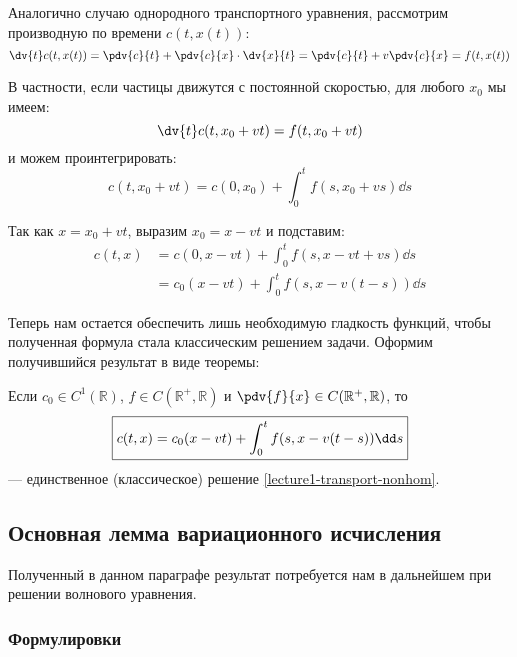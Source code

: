 Аналогично случаю однородного транспортного уравнения, рассмотрим производную по времени $c(t, x(t))$:
%
\begin{equation*}
  \dv{t} c(t, x(t)) = \pdv{c}{t} + \pdv{c}{x} \cdot \dv{x}{t} = \pdv{c}{t} + v \pdv{c}{x} = f(t, x(t))
\end{equation*}

В частности, если частицы движутся с постоянной скоростью, для любого $x_0$ мы имеем:
\begin{equation*}
  \dv{t} c(t, x_0 + vt) = f(t, x_0 + vt)
\end{equation*}
%
и можем проинтегрировать:
%
\begin{equation*}
  c(t, x_0 + vt) = c(0, x_0) + \int_0^t f(s, x_0 + vs) \dd s
\end{equation*}

Так как $x = x_0 + vt$, выразим $x_0 = x - vt$ и подставим:
%
\begin{equation*}
  \begin{aligned}
  c(t, x) &= c(0, x - vt) + \int_0^t f(s, x - vt + vs) \dd s\\
  &= c_0(x - vt) + \int_0^t f(s, x - v(t - s)) \dd s
  \end{aligned}
\end{equation*}

Теперь нам остается обеспечить лишь необходимую гладкость функций, чтобы полученная формула стала классическим решением задачи. Оформим получившийся результат в виде теоремы:
%
\begin{thm}
  Если $c_0 \in C^1(\mathbb{R})$, $f \in C(\mathbb{R}^+, \mathbb{R})$ и $\pdv{f}{x} \in C(\mathbb{R}^+, \mathbb{R})$, то
  \begin{equation}
    \boxed{%
      c(t, x) = c_0(x - vt) + \int_0^t f(s, x - v(t - s)) \dd s}
    \label{lecture1-transport-nonhom-sol}
  \end{equation}
  --- единственное (классическое) решение \eqref{lecture1-transport-nonhom}.
\end{thm}

\subsection{Основная лемма вариационного исчисления}

Полученный в данном параграфе результат потребуется нам в дальнейшем при решении волнового уравнения.

\subsubsection{Формулировки}

